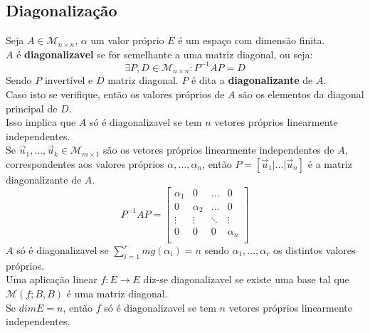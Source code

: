 \documentclass[]{report}
\begin{document}
\subsection{Diagonalização}
Seja $A\in \mathcal{M}_{n \times n}$, $\alpha$ um valor próprio $E$ é um espaço com dimensão finita.\\[2mm]
$A$ é \textbf{diagonalizavel} se for semelhante a uma matriz diagonal, ou seja:
$$\exists P, D \in \mathcal{M}_{n \times n}: P^{-1}AP = D$$
Sendo $P$ invertível e $D$ matriz diagonal. $P$ é dita a \textbf{diagonalizante} de $A$.\\
Caso isto se verifique, então os valores próprios de $A$ são os elementos da diagonal principal de $D$.\\
Isso implica que $A$ só é diagonalizavel se tem $n$ vetores próprios linearmente independentes.\\[5mm]
Se $\vec u_1, \dots, \vec u_k \in \mathcal{M}_{m \times 1}$ são os vetores próprios linearmente independentes de $A$, correspondentes aos valores próprios $\alpha, \dots, \alpha_n$, então $P = [\vec u_1 | \dots | \vec u_n] $ é a matriz diagonalizante de $A$.
$$P^{-1}AP =
\begin{bmatrix}
\alpha_1 & 0 & \dots & 0 \\
0 & \alpha_2 & \dots & 0 \\
\vdots & \vdots & \ddots & \vdots \\
0 & 0 & 0 & \alpha_n \\
\end{bmatrix}$$
$A$ só é diagonalizavel se $\sum_{i=1}^r mg(\alpha_i) = n$ sendo $\alpha_1, \dots, \alpha_r$ os distintos valores próprios.\\[5mm]
Uma aplicação linear $f: E \to E$ diz-se diagonalizavel se existe uma base tal que $\mathcal{M}(f; B, B)$ é uma matriz diagonal.\\
Se $dim E = n$, então $f$ só é diagonalizavel se tem $n$ vetores próprios linearmente independentes.
\end{document}
